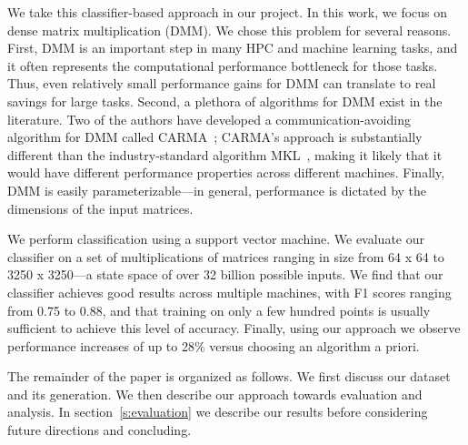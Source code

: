 We take this classifier-based approach in our project.
In this work, we focus on dense matrix multiplication (DMM).
We chose this problem for several reasons.
First, DMM is an important step in many HPC and machine learning tasks, and it often represents the computational performance bottleneck for those tasks.
Thus, even relatively small performance gains for DMM can translate to real savings for large tasks.
Second, a plethora of algorithms for DMM exist in the literature.
Two of the authors have developed a communication-avoiding algorithm for DMM called CARMA~\cite{demmel2013communication}; CARMA's approach is substantially different than the industry-standard algorithm MKL~\cite{intel2007intel}, making it likely that it would have different performance properties across different machines.
Finally, DMM is easily parameterizable---in general, performance is dictated by the dimensions of the input matrices.

We perform classification using a support vector machine.
We evaluate our classifier on a set of multiplications of matrices ranging in size from 64 x 64 to 3250 x 3250---a state space of over 32 billion possible inputs.
We find that our classifier achieves good results across multiple machines, with F1 scores ranging from 0.75 to 0.88, and that training on only a few hundred points is usually sufficient to achieve this level of accuracy.
Finally, using our approach we observe performance increases of up to 28\% versus choosing an algorithm a priori.

The remainder of the paper is organized as follows.
We first discuss our dataset and its generation.
We then describe our approach towards evaluation and analysis.
In section~\ref{s:evaluation} we describe our results before considering future directions and concluding.
